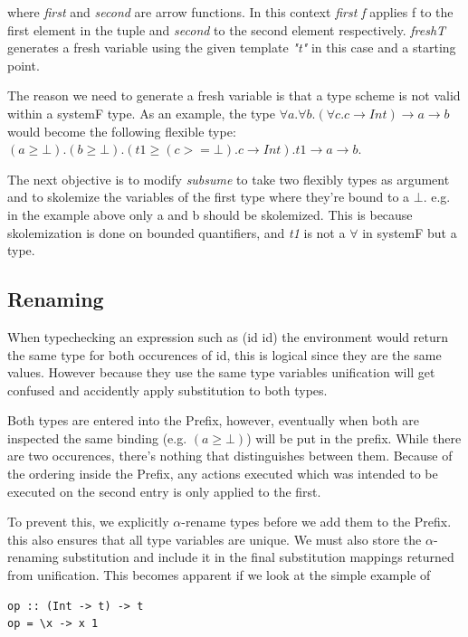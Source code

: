 \documentclass[12pt, a4paper, oneside]{article}
\begin{document}
where \textit{first} and \textit{second} are arrow functions. In this context \emph{first f} applies f to the first element in the tuple and \emph{second} to the second element respectively. \emph{freshT} generates a fresh variable using the given template \emph{"t"} in this case and a starting point.

The reason we need to generate a fresh variable is that a type scheme is not valid within a systemF type. As an example, the type $\forall a. \forall b. (\forall c. c \rightarrow Int) \rightarrow a \rightarrow b$ would become the following flexible type: $(a \geq \bot). (b \geq \bot). (t1 \geq (c >= \bot). c \rightarrow Int). t1 \rightarrow a \rightarrow b$.

The next objective is to modify \emph{subsume} to take two flexibly types as argument and to skolemize the variables of the first type where they're bound to a $\bot$. e.g. in the example above only a and b should be skolemized. This is because skolemization is done on bounded quantifiers, and \emph{t1} is not a $\forall$ in systemF but a type.

\subsection{Renaming}
When typechecking an expression such as (id id) the environment would return the same type for both occurences of id, this is logical since they are the same values. However because they use the same type variables unification will get confused and accidently apply substitution to both types.

Both types are entered into the Prefix, however, eventually when both are inspected the same binding (e.g. $(a \geq \bot)$) will be put in the prefix. While there are two occurences, there's nothing that distinguishes between them. Because of the ordering inside the Prefix, any actions executed which was intended to be executed on the second entry is only applied to the first.

To prevent this, we explicitly $\alpha$-rename types before we add them to the Prefix. this also ensures that all type variables are unique. We must also store the $\alpha$-renaming substitution and include it in the final substitution mappings returned from unification. This becomes apparent if we look at the simple example of

\begin{lstlisting}
op :: (Int -> t) -> t
op = \x -> x 1
\end{lstlisting}
\end{document}

